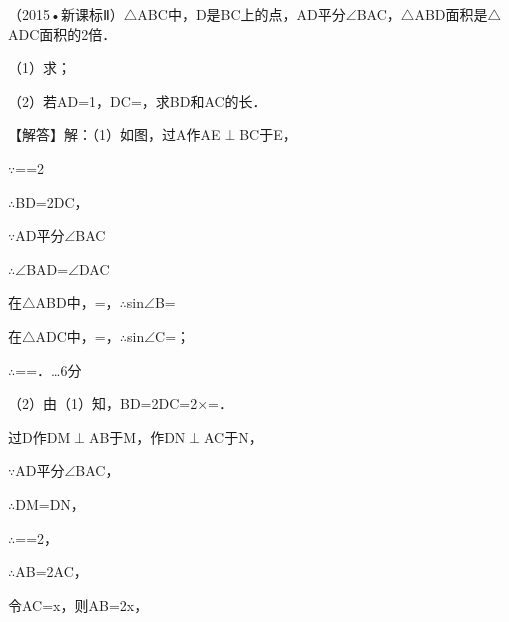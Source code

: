 \begin{question}
（2015•新课标Ⅱ）$\triangle$ABC中，D是BC上的点，AD平分$\angle$BAC，$\triangle$ABD面积是$\triangle$ADC面积的2倍．\par
（1）求\allowbreak{}；\par
（2）若AD=1，DC=\allowbreak{}，求BD和AC的长．\par
\begin{solution}
【解答】解：（1）如图，过A作AE$\perp$BC于E，\par
$\because$\allowbreak{}=\allowbreak{}=2\par
$\therefore$BD=2DC，\par
$\because$AD平分$\angle$BAC\par
$\therefore$$\angle$BAD=$\angle$DAC\par
在$\triangle$ABD中，\allowbreak{}=\allowbreak{}，$\therefore$sin$\angle$B=\allowbreak{}\par
在$\triangle$ADC中，\allowbreak{}=\allowbreak{}，$\therefore$sin$\angle$C=\allowbreak{}；\par
$\therefore$\allowbreak{}=\allowbreak{}=\allowbreak{}．…6分\par
（2）由（1）知，BD=2DC=2×\allowbreak{}=\allowbreak{}．\par
过D作DM$\perp$AB于M，作DN$\perp$AC于N，\par
$\because$AD平分$\angle$BAC，\par
$\therefore$DM=DN，\par
$\therefore$\allowbreak{}=\allowbreak{}=2，\par
$\therefore$AB=2AC，\par
令AC=x，则AB=2x，\par
$$
\end{solution}
\end{question}

